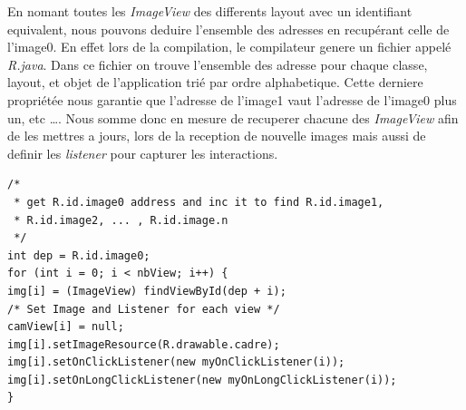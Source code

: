 En nomant toutes les \textit{ImageView} des differents layout avec un
identifiant equivalent, nous pouvons deduire l'ensemble des adresses en
recupérant celle de l'image0.
En effet lors de la compilation, le compilateur genere un fichier appelé
\textit{R.java}. Dans ce fichier on trouve l'ensemble des adresse pour chaque
classe, layout, et objet de l'application trié par ordre alphabetique. Cette
derniere propriétée nous garantie que l'adresse de l'image1 vaut l'adresse de
l'image0 plus un, etc \ldots. Nous somme donc en mesure de recuperer chacune des 
\textit{ImageView} afin de les mettres a jours, lors de la reception de nouvelle
images mais aussi de definir les \textit{listener} pour capturer les
interactions.
\begin{changemargin}{0cm}{-2cm}
\begin{lstlisting}[caption={ImageView address resolver}] 
/*
 * get R.id.image0 address and inc it to find R.id.image1,
 * R.id.image2, ... , R.id.image.n
 */
int dep = R.id.image0;
for (int i = 0; i < nbView; i++) {
img[i] = (ImageView) findViewById(dep + i);
/* Set Image and Listener for each view */
camView[i] = null;
img[i].setImageResource(R.drawable.cadre);
img[i].setOnClickListener(new myOnClickListener(i));
img[i].setOnLongClickListener(new myOnLongClickListener(i));
}
\end{lstlisting}   
\end{changemargin}

